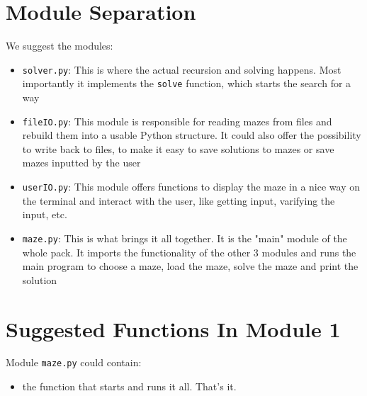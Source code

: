 \section{Module Separation}
We suggest the modules:
\begin{itemize}
	\item \texttt{solver.py}:
	      This is where the actual recursion and solving happens.
	      Most importantly it implements the \texttt{solve} function, which
	      starts the search for a way
	\item \texttt{fileIO.py}:
	      This module is responsible for reading mazes from files and rebuild them
	      into a usable Python structure. It could also offer the possibility to write
          back to files, to make it easy to save solutions to mazes or save mazes
          inputted by the user
	\item \texttt{userIO.py}:
	      This module offers functions to display the maze in a nice way on the
	      terminal and interact with the user, like getting input, varifying the input, etc.
	\item \texttt{maze.py}:
	      This is what brings it all together. It is the "main" module of the whole pack.
	      It imports the functionality of the other 3 modules and runs the main program to
	      choose a maze, load the maze, solve the maze and print the solution
\end{itemize}
\pagebreak

\section{Suggested Functions In Module 1}
Module \texttt{maze.py} could contain:
\begin{itemize}
	\item {} the function that starts and runs it all. That's it.
\end{itemize}
\pagebreak

